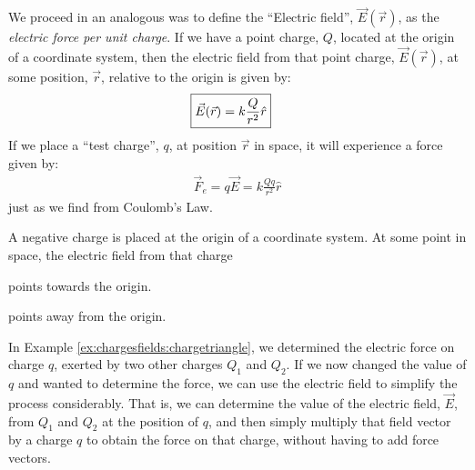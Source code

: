 We proceed in an analogous was to define the ``Electric field'', $\vec E(\vec r)$, as the \textit{electric force per unit charge}. If we have a point charge, $Q$, located at the origin of a coordinate system, then the electric field from that point charge, $\vec E(\vec r)$, at some position, $\vec r$, relative to the origin is given by:
\begin{align*}
\Aboxed{\vec E(\vec r) = k\frac{Q}{r^2}\hat r}
\end{align*}
If we place a ``test charge'', $q$, at position $\vec r$ in space, it will experience a force given by:
\begin{align*}
\vec F_e=q\vec E=k\frac{Qq}{r^2}\hat r
\end{align*}
just as we find from Coulomb's Law. 
\begin{checkpoint}\label{cp:chargesfields:edirection}
\begin{MCquestion}{A negative charge is placed at the origin of a coordinate system. At some point in space, the electric field from that charge}
\item points towards the origin. \correct
\item points away from the origin.
\end{MCquestion}
\end{checkpoint}
In Example \ref{ex:chargesfields:chargetriangle}, we determined the electric force on charge $q$, exerted by two other charges $Q_1$ and $Q_2$. If we now changed the value of $q$ and wanted to determine the force, we can use the electric field to simplify the process considerably. That is, we can determine the value of the electric field, $\vec E$, from $Q_1$ and $Q_2$ at the position of $q$, and then simply multiply that field vector by a charge $q$ to obtain the force on that charge, without having to add force vectors.
